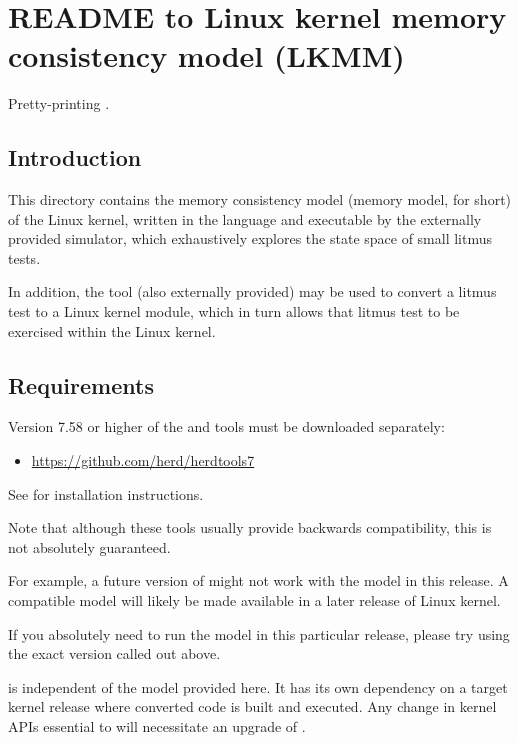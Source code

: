 \chapter{README to Linux kernel memory consistency model (LKMM)}
\label{chp:lkmm-README}

Pretty-printing .

\section{Introduction}

This directory contains the memory consistency model (memory model, for
short) of the Linux kernel, written in the  language and executable
by the externally provided  simulator, which exhaustively explores
the state space of small litmus tests.

In addition, the  tool (also externally provided) may be used
to convert a litmus test to a Linux kernel module, which in turn allows
that litmus test to be exercised within the Linux kernel.


\section{Requirements}

Version 7.58 or higher of the  and  tools must be
downloaded separately:

\begin{itemize}
  \item \url{https://github.com/herd/herdtools7}
\end{itemize}

See  for installation instructions.

Note that although these tools usually provide backwards compatibility,
this is not absolutely guaranteed.

For example, a future version of  might not work with the model
in this release.
A compatible model will likely be made available in a later release of
Linux kernel.

If you absolutely need to run the model in this particular release,
please try using the exact version called out above.

 is independent of the model provided here.  It has its own
dependency on a target kernel release where converted code is built
and executed.  Any change in kernel APIs essential to  will
necessitate an upgrade of .

